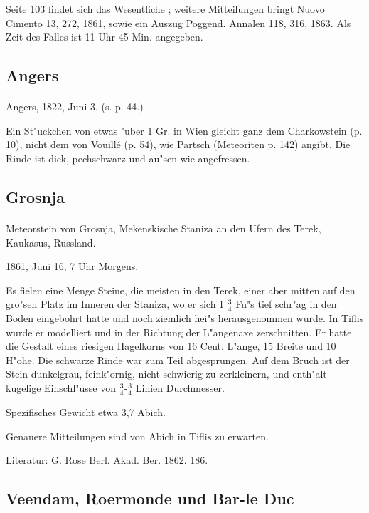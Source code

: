 \documentclass[a4paper, 11pt, oneside]{article}
\begin{document}
Seite 103 findet sich das Wesentliche ; weitere Mitteilungen bringt Nuovo Cimento 13, 272, 1861, sowie ein Auszug Poggend. Annalen 118, 316, 1863. Als Zeit des Falles ist 11 Uhr 45 Min. angegeben.

\subsection{Angers}
\paragraph{}
Angers, 1822, Juni 3. (s. p. 44.)

Ein St"uckchen von etwas "uber 1 Gr. in Wien gleicht ganz dem Charkowstein (p. 10), nicht dem von Vouillé (p. 54), wie Partsch (Meteoriten p. 142) angibt. Die Rinde ist dick, pechschwarz und au"sen wie angefressen.

\subsection{Grosnja}
\paragraph{}
Meteorstein von Grosnja, Mekenskische Staniza an den Ufern des Terek, Kaukasus, Russland.

1861, Juni 16, 7 Uhr Morgens.

Es fielen eine Menge Steine, die meisten in den Terek, einer aber mitten auf den gro"sen Platz im Inneren der Staniza, wo er sich 1 $\frac{3}{4}$ Fu"s tief schr"ag in den Boden eingebohrt hatte und noch ziemlich hei"s herausgenommen wurde. In Tiflis wurde er modelliert und in der Richtung der L"angenaxe zerschnitten. Er hatte die Gestalt eines riesigen Hagelkorns von 16 Cent. L"ange, 15 Breite und 10 H"ohe. Die schwarze Rinde war zum Teil abgesprungen. Auf dem Bruch ist der Stein dunkelgrau, feink"ornig, nicht schwierig zu zerkleinern, und enth"alt kugelige Einschl"usse von $\frac{3}{4}$-$\frac{3}{4}$ Linien Durchmesser.

Spezifisches Gewicht etwa 3,7 Abich.

Genauere Mitteilungen sind von Abich in Tiflis zu erwarten.

\footnotesize
Literatur: G. Rose Berl. Akad. Ber. 1862. 186.

\subsection{Veendam, Roermonde und Bar-le Duc}
\normalsize
\end{document}
